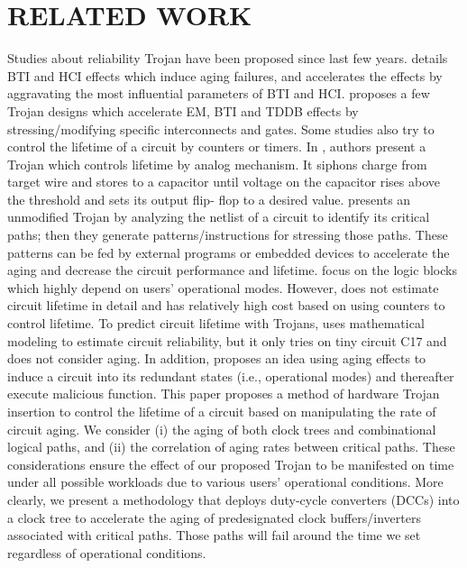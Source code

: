 \section{RELATED WORK}
\label{sec:related}
Studies about reliability Trojan have been proposed since last few years. \cite{shiyanovskii2010process} details BTI and HCI effects which induce aging failures, and accelerates the effects by aggravating the most influential parameters of BTI and HCI. \cite{sreedhar2012reliability} proposes a few Trojan designs which accelerate EM, BTI and TDDB effects by stressing/modifying specific interconnects and gates. Some studies also try to control the lifetime of a circuit by counters or timers. In \cite{yang2016a2}, authors present a Trojan which controls lifetime by analog mechanism. It siphons charge from target wire and stores to a capacitor until voltage on the capacitor rises above the threshold and sets its output flip- flop to a desired value.  \cite{karimi2015magic} presents an unmodified Trojan by analyzing the netlist of a circuit to identify its critical paths; then they generate patterns/instructions for stressing those paths. These patterns can be fed by external programs or embedded devices to accelerate the aging and decrease the circuit performance and lifetime. \cite{yang2016a2} \cite{karimi2015magic} focus on the logic blocks which highly depend on users' operational modes. However, \cite{shiyanovskii2010process} does not estimate circuit lifetime in detail and \cite{sreedhar2012reliability} has relatively high cost based on using counters to control lifetime. To predict circuit lifetime with Trojans, \cite{burman2012effect} uses mathematical modeling to estimate circuit reliability, but it only tries on tiny circuit C17 and does not consider aging. In addition, \cite{wei2013undetectable} proposes an idea using aging effects to induce a circuit into its redundant states (i.e., operational modes) and thereafter execute malicious function.
This paper proposes a method of hardware Trojan insertion to control the lifetime of a circuit based on manipulating the rate of circuit aging. We consider (i) the aging of both clock trees and combinational logical paths, and (ii) the correlation of aging rates between critical paths. These considerations ensure the effect of our proposed Trojan to be manifested on time under all possible workloads due to various users' operational conditions. More clearly, we present a methodology that deploys duty-cycle converters (DCCs) into a clock tree to accelerate the aging of predesignated clock buffers/inverters associated with critical paths. Those paths will fail around the time we set regardless of operational conditions.

